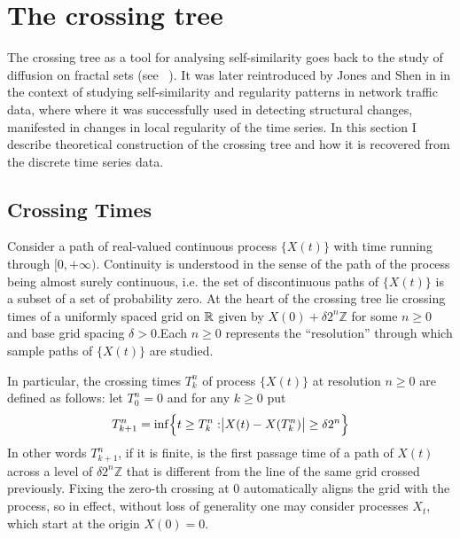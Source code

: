 \chapter{The crossing tree} %
\label{cha:the_crossing_tree}

The crossing tree as a tool for analysing self-similarity goes back to the study of
diffusion on fractal sets (see ~\cite{BarlowPerkins88}). It was later reintroduced by Jones
and Shen in \cite{jones2004} in the context of studying self-similarity and regularity
patterns in network traffic data, where where it was successfully used in detecting
structural changes, manifested in changes in local regularity of the time series.
In this section I describe theoretical construction of the crossing tree and how
it is recovered from the discrete time series data.

\section{Crossing Times} %
\label{sec:crossing_times}

Consider a path of real-valued continuous process $\{X(t)\}$ with time running through
$[0,+\infty)$. Continuity is understood in the sense of the path of the process
being almost surely continuous, i.e. the set of discontinuous paths of $\{X(t)\}$
is a subset of a set of probability zero. At the heart of the crossing tree lie
crossing times of a uniformly spaced grid on $\mathbb{R}$ given by $X(0) + \delta 2^n \mathbb{Z}$
for some $n\geq 0$ and base grid spacing $\delta > 0$.\footnotemark Each $n\geq 0$
represents the ``resolution'' through which sample paths of $\{X(t)\}$ are studied.

In particular, the crossing times $T_k^n$ of process $\{X(t)\}$ at resolution $n\geq 0$
are defined as follows: let $T_0^n = 0$ and for any $k\geq 0$ put
\[
T_{k+1}^n
= \inf \Bigl\{ t \geq T^n_k : \bigr | X(t) - X(T^n_k) \bigr | \geq \delta 2^n \Bigr\}
\]
In other words $T_{k+1}^n$, if it is finite, is the first passage time of a path of
$X(t)$ across a level of $\delta 2^n \mathbb{Z}$ that is different from the line of
the same grid crossed previously. Fixing the zero-th crossing at $0$ automatically
aligns the grid with the process, so in effect, without loss of generality one may
consider processes $X_t$, which start at the origin $X(0)=0$.

